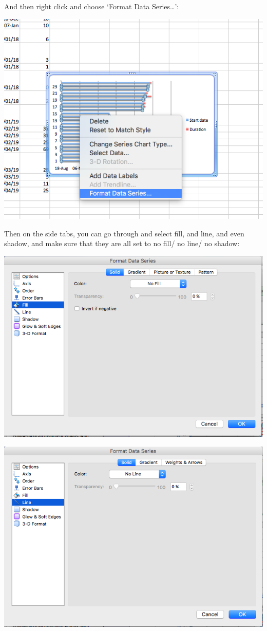 \documentclass[
]{book}
\begin{document}
And then right click and choose `Format Data Series\ldots{}':

\includegraphics{imgs/gantt_format.png}

Then on the side tabs, you can go through and select fill, and line, and even shadow, and make sure that they are all set to no fill/ no line/ no shadow:

\includegraphics{imgs/gant_no_fill.png}

\includegraphics{imgs/gantt_no_line.png}
\end{document}
